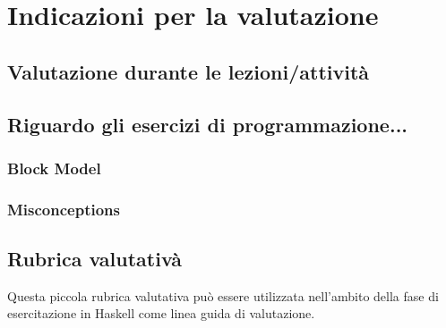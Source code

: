 \chapter{Indicazioni per la valutazione}

\section{Valutazione durante le lezioni/attività}

\section{Riguardo gli esercizi di programmazione...}

\subsection{Block Model}

\subsection{Misconceptions}

\section{Rubrica valutativà}

Questa piccola rubrica valutativa può essere utilizzata nell'ambito della fase di esercitazione in Haskell
come linea guida di valutazione.


